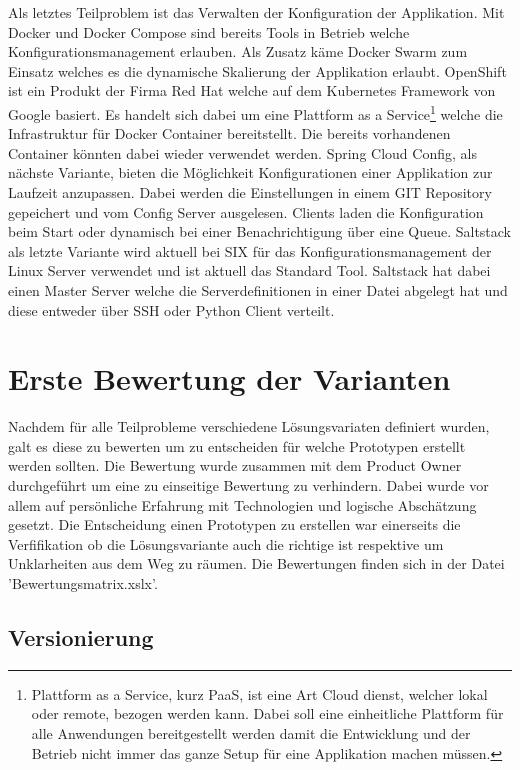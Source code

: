 Als letztes Teilproblem ist das Verwalten der Konfiguration der Applikation. Mit Docker und Docker Compose sind bereits Tools in Betrieb welche Konfigurationsmanagement erlauben. Als Zusatz käme Docker Swarm zum Einsatz welches es die dynamische Skalierung der Applikation erlaubt.\newline
OpenShift ist ein Produkt der Firma Red Hat welche auf dem Kubernetes Framework von Google basiert. Es handelt sich dabei um eine Plattform as a Service\footnote{Plattform as a Service, kurz PaaS, ist eine Art Cloud dienst, welcher lokal oder remote, bezogen werden kann. Dabei soll eine einheitliche Plattform für alle Anwendungen bereitgestellt werden damit die Entwicklung und der Betrieb nicht immer das ganze Setup für eine Applikation machen müssen.} welche die Infrastruktur für Docker Container bereitstellt. Die bereits vorhandenen Container könnten dabei wieder verwendet werden.\newline
Spring Cloud Config, als nächste Variante, bieten die Möglichkeit Konfigurationen einer Applikation zur Laufzeit anzupassen. Dabei werden die Einstellungen in einem GIT Repository gepeichert und vom Config Server ausgelesen. Clients laden die Konfiguration beim Start oder dynamisch bei einer Benachrichtigung über eine Queue.
Saltstack als letzte Variante wird aktuell bei SIX für das Konfigurationsmanagement der Linux Server verwendet und ist aktuell das Standard Tool. Saltstack hat dabei einen Master Server welche die Serverdefinitionen in einer Datei abgelegt hat und diese entweder über SSH oder Python Client verteilt.

\section{Erste Bewertung der Varianten}

Nachdem für alle Teilprobleme verschiedene Lösungsvariaten definiert wurden, galt es diese zu bewerten um zu entscheiden für welche Prototypen erstellt werden sollten. Die Bewertung wurde zusammen mit dem Product Owner durchgeführt um eine zu einseitige Bewertung zu verhindern. Dabei wurde vor allem auf persönliche Erfahrung mit Technologien und logische Abschätzung gesetzt. Die Entscheidung einen Prototypen zu erstellen war einerseits die Verfifikation ob die Lösungsvariante auch die richtige ist respektive um Unklarheiten aus dem Weg zu räumen. Die Bewertungen finden sich in der Datei 'Bewertungsmatrix.xslx'. 

\subsection{Versionierung}

